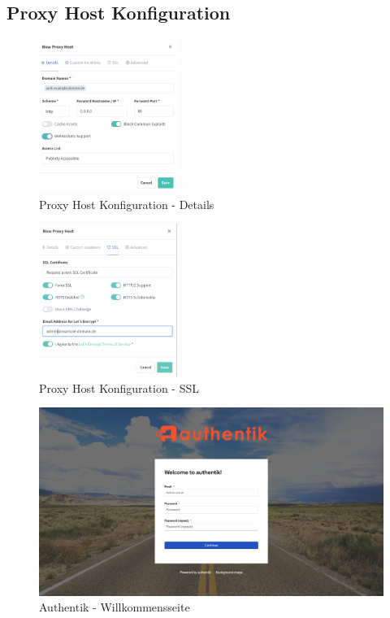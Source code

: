 \subsection{Proxy Host Konfiguration}
\label{app:ProxyHostConfig}
\begin{figure}[ht]
    \centering
    \includegraphics[width=0.4\textwidth]{Bilder/Authentik-Doc/NewProxyHost.png}
    \caption{Proxy Host Konfiguration - Details}
  \end{figure}
  
  \vspace{0.75cm} %
  
  \begin{figure}[ht]
    \centering
    \includegraphics[width=0.4\textwidth]{Bilder/Authentik-Doc/NewProxyHostSSL.png}
    \caption{Proxy Host Konfiguration - SSL}
  \end{figure}
  
  \vspace{0.75cm} %
  
  \begin{figure}[ht]
    \centering
    \includegraphics[width=1\textwidth]{Bilder/Authentik-Doc/WP_00_WelcomePageFirstTimeAfterSetup.png}
    \caption{Authentik - Willkommensseite}
  \end{figure}

